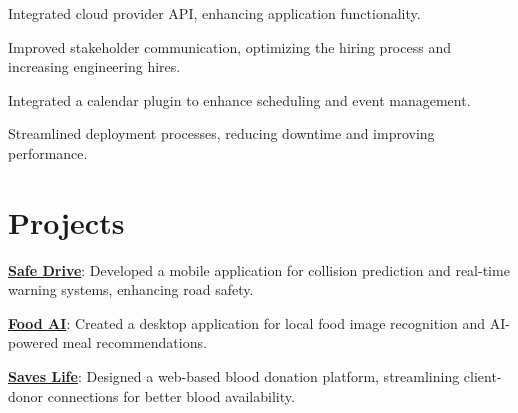 \documentclass[]{deedy-resume-openfont}
\begin{document}
\begin{minipage}[t]{0.66\textwidth}
\vspace{\topsep} %
\begin{tightemize}
 \item Integrated cloud provider API, enhancing application functionality.
\item Improved stakeholder communication, optimizing the hiring process and increasing engineering hires.
\end{tightemize}
\sectionsep

\begin{tightemize}
 \item Integrated a calendar plugin to enhance scheduling and event management.
 \item Streamlined deployment processes, reducing downtime and improving performance.
\end{tightemize}
\sectionsep

\section{Projects}
\vspace{1.5 em} %
\begin{tightemize}
\item \textbf{\href{https://github.com/SafeDrive120}{Safe Drive}}: Developed a mobile application for collision prediction and real-time warning systems, enhancing road safety.
\item \textbf{\href{https://github.com/MuhammadSaad20/FoodAIN}{Food AI}}: Created a desktop application for local food image recognition and AI-powered meal recommendations.
\item \textbf{\href{https://github.com/MuhammadSaad20/SAVESLIFE/tree/master}{Saves Life}}: Designed a web-based blood donation platform, streamlining client-donor connections for better blood availability.
\end{tightemize}
\sectionsep
\end{minipage} 
\end{document}
